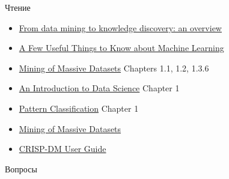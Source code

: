 \documentclass[aspectratio=169]{beamer}
\begin{document}
\begin{frame}{Чтение}

\begin{itemize}
\item \href{https://www.aaai.org/ojs/index.php/aimagazine/article/viewFile/1230/1131}{From data mining to knowledge discovery: an overview}
\item \href{https://homes.cs.washington.edu/~pedrod/papers/cacm12.pdf}{A Few Useful Things to Know about Machine Learning}
\item \href{http://infolab.stanford.edu/~ullman/mmds/book.pdf}{Mining of Massive Datasets} Chapters 1.1, 1.2, 1.3.6
\item \href{https://ischool.syr.edu/media/documents/2012/3/DataScienceBook1_1.pdf}{An Introduction to Data Science} Chapter 1
\item \href{https://www.amazon.com/Pattern-Classification-Pt-1-Richard-Duda/dp/0471056693}{Pattern Classification} Chapter 1
\item \href{http://infolab.stanford.edu/~ullman/mmds/book.pdf}{Mining of Massive Datasets}
\item \href{http://www.springer.com/us/book/9780387098227}{CRISP-DM User Guide}
\end{itemize}

\end{frame}

\begin{frame}[plain]
\begin{center}
{\Large Вопросы}
\end{center}
\end{frame}
\end{document}
